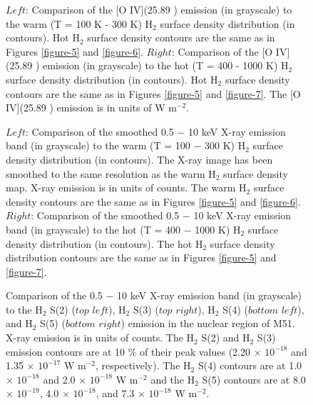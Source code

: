 \documentclass[12pt,preprint]{aastex}
\begin{document}
\clearpage

\begin{figure}
\caption{$Left$:  Comparison of the [O IV](25.89 \micron) emission (in grayscale) to 
the warm (T = 100 K - 300 K) H$_2$ surface density distribution (in contours).  
Hot H$_2$ surface density contours are the same as in Figures \ref{figure-5} and \ref{figure-6}.  
$Right$: Comparison of the [O IV](25.89 \micron) emission (in grayscale) to the hot 
(T = 400 - 1000 K) H$_2$ surface density distribution (in contours).  Hot H$_2$ 
surface density contours are the same as in Figures \ref{figure-5} and \ref{figure-7}.  The [O IV](25.89 \micron)
 emission is in units of W $\mathrm{m^{-2}}$.}
\label{figure-15}
\end{figure}

\clearpage

\begin{figure}
\caption{$Left$:  Comparison of the smoothed 0.5 $-$ 10 keV X-ray emission band 
(in grayscale) to the warm (T = 100 $-$ 300 K) H$_2$ surface density distribution 
(in contours).   The X-ray image has been smoothed to the same resolution as the 
warm H$_2$ surface density map.  X-ray emission is in units of counts.  The warm H$_2$ 
surface density contours are the same as in Figures \ref{figure-5} and \ref{figure-6}.  $Right$: 
Comparison of the smoothed 0.5 $-$ 10 keV X-ray emission band (in grayscale) to the hot 
(T = 400 $-$ 1000 K) H$_2$ surface density distribution (in contours).  The hot
H$_2$ surface density distribution contours are the same as in Figures \ref{figure-5} 
and \ref{figure-7}.}
\label{figure-16}
\end{figure}

\clearpage

\begin{figure}
\caption{Comparison of the 0.5 $-$ 10 keV X-ray emission band (in grayscale) to the 
H$_2$ S(2) ($top$ $left$), H$_2$ S(3) ($top$ $right$), 
H$_2$ S(4) ($bottom$ $left$), and H$_2$ S(5) ($bottom$ $right$) 
emission in the nuclear region of M51.  X-ray emission is in units of counts.  
The H$_2$ S(2) and H$_2$ S(3) emission contours are at 
10 \% of their peak values (2.20 $\times$ ${10^{-18}}$ and 1.35 $\times$ ${10^{-17}}$ 
W $\mathrm{m^{-2}}$, respectively).  The H$_2$ S(4) contours are at 1.0 
$\times$ ${10^{-18}}$ and 2.0 $\times$ ${10^{-18}}$ W $\mathrm{m^{-2}}$ and the 
H$_2$ S(5) contours are at 8.0 $\times$ ${10^{-19}}$, 4.0 $\times$ ${10^{-18}}$, 
and 7.3 $\times$ ${10^{-18}}$ W $\mathrm{m^{-2}}$.}
\label{figure-17}
\end{figure}
\end{document}
